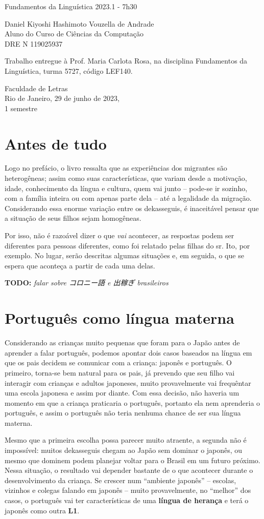 \documentclass{article}
\date{}
\newcommand{\jap}[1]{#1}
\newcommand{\todo}[1]{\textbf{TODO:} \textit{#1}}
\newcommand{\keyword}[1]{\textbf{#1}}
\newcommand{\dekassegui}{\jap{出稼ぎ}}
\newcommand{\koroniago}{\jap{コロニー語}}
\newcommand{\dre}{119025937}
\newcommand{\hashi}{Daniel Kiyoshi Hashimoto Vouzella de Andrade}
\newcommand{\mytitle}{Fundamentos da Linguística 2023.1 - 7h30}
\newcommand{\myauthor}{\hashi{} \\
    Aluno do Curso de Ciências da Computação \\
    DRE N\textdegree{} \dre{}
}
\newcommand{\makecapa}{
    \newpage
    \hfill\par\vfill

    \begin{center}
        \huge
        \mytitle{}
    \end{center}

    \vfill

    \begin{center}
        \Large
        \myauthor{}
    \end{center}

    \vfill
    \vfill
    \begin{multicols}{3}
        \par\hfill \columnbreak

        \par\hfill \columnbreak

        Trabalho entregue à
        Prof. Maria Carlota Rosa,
        na disciplina
        Fundamentos da Linguística,
        turma 5727,
        código LEF140.
    \end{multicols}

    \vfill

    \begin{center}
        Faculdade de Letras \\
        Rio de Janeiro, 29 de junho de 2023, \\
        1\textdegree{} semestre
    \end{center}

    \pagenumbering{gobble}
    \newpage
    \pagenumbering{arabic}
}
\begin{document}
\makecapa

\setcounter{section}{-1}
\section{Antes de tudo}

Logo no prefácio, o livro \cite{filhosdekasegi}
ressalta que as experiências dos migrantes são heterogêneas;
assim como suas características, que variam desde
a motivação, idade, conhecimento da língua e cultura,
quem vai junto
-- pode-se ir sozinho, com a família inteira ou
com apenas parte dela --
até a legalidade da migração.
Considerando essa enorme variação entre os dekasseguis,
é inaceitável pensar que a situação de seus filhos
sejam homogêneas.

Por isso, não é razoável dizer
o que \emph{vai} acontecer,
as respostas podem ser diferentes para pessoas diferentes,
como foi relatado pelas filhas do sr. Ito, por exemplo.
No lugar, serão descritas algumas situações
e, em seguida,
o que se espera que aconteça
a partir de cada uma delas.

\todo{falar sobre \koroniago{} \cite{viagemling} e \dekassegui{} brasileiros}

\section{Português como língua materna}

Considerando as crianças muito pequenas
que foram para o Japão antes de aprender a falar português,
podemos apontar dois casos
baseados na língua em que
os pais decidem se comunicar com a criança:
japonês e português.
O primeiro, torna-se bem natural para os pais,
já prevendo que seu filho vai interagir com
crianças e adultos japoneses,
muito provavelmente vai frequêntar uma escola japonesa e
assim por diante.
Com essa decisão,
não haveria um momento em que a criança
praticaria o português,
portanto ela nem aprenderia o português,
e assim o português não teria nenhuma chance de
ser sua língua materna.

Mesmo que a primeira escolha possa parecer muito atraente,
a segunda não é impossível:
muitos dekasseguis chegam ao Japão sem dominar o japonês,
ou mesmo que dominem podem planejar voltar para o Brasil
em um futuro próximo.
Nessa situação, o resultado vai depender bastante
de o que acontecer durante o desenvolvimento da criança.
Se crescer num ``ambiente japonês''
-- escolas, vizinhos e colegas falando em japonês --
muito provavelmente, no ``melhor'' dos casos,
o português vai ter características de uma
\keyword{língua de herança} e
terá o japonês como outra \keyword{L1}.
\end{document}
